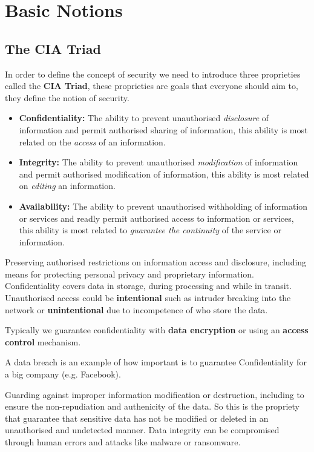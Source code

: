 \section{Basic Notions}
    \subsection{The CIA Triad}
    In order to define the concept of security we need to introduce three proprieties called the \textbf{CIA Triad}, these proprieties are goals that everyone should aim to, they define the notion of security.
    \begin{itemize}
        \item \textbf{Confidentiality:} The ability to prevent unauthorised \textit{disclosure} of information and permit authorised sharing of information, this ability is most related on the \textit{access} of an information.
        \item \textbf{Integrity:} The ability to prevent unauthorised \textit{modification} of information and permit authorised modification of information, this ability is most related on \textit{editing} an information.
        \item \textbf{Availability:} The ability to prevent unauthorised withholding of information or services and readly permit authorised access to information or services, this ability is most related to \textit{guarantee the continuity} of the service or information.
    \end{itemize}
    
    Preserving authorised restrictions on information access and disclosure, including means for protecting personal privacy and proprietary information. Confidentiality covers data in storage, during processing and while in transit. Unauthorised access could be \textbf{intentional} such as intruder breaking into the network or \textbf{unintentional} due to incompetence of who store the data. 
    
    Typically we guarantee confidentiality with \textbf{data encryption} or using an \textbf{access control} mechanism.

    A data breach is an example of how important is to guarantee Confidentiality for a big company (e.g. Facebook).
    
    Guarding against improper information modification or destruction, including to ensure the non-repudiation and authenicity of the data. So this is the propriety that guarantee that sensitive data has not be modified or deleted in an unauthorised and undetected manner. Data integrity can be compromised through human errors and attacks like malware or ransomware.
    
